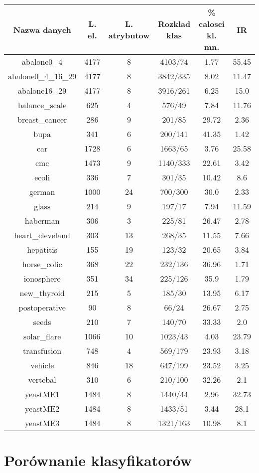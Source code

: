 \begin{tabular}{|c|c|c|c|c|c|}%
	\hline%
	Nazwa danych&L. el.&L. atrybutow&Rozklad klas&\% calosci kl. mn.&IR\\%
	\hline%
	abalone0\_4&4177&8&4103/74&1.77&55.45\\%
	\hline%
	abalone0\_4\_16\_29&4177&8&3842/335&8.02&11.47\\%
	\hline%
	abalone16\_29&4177&8&3916/261&6.25&15.0\\%
	\hline%
	balance\_scale&625&4&576/49&7.84&11.76\\%
	\hline%
	breast\_cancer&286&9&201/85&29.72&2.36\\%
	\hline%
	bupa&341&6&200/141&41.35&1.42\\%
	\hline%
	car&1728&6&1663/65&3.76&25.58\\%
	\hline%
	cmc&1473&9&1140/333&22.61&3.42\\%
	\hline%
	ecoli&336&7&301/35&10.42&8.6\\%
	\hline%
	german&1000&24&700/300&30.0&2.33\\%
	\hline%
	glass&214&9&197/17&7.94&11.59\\%
	\hline%
	haberman&306&3&225/81&26.47&2.78\\%
	\hline%
	heart\_cleveland&303&13&268/35&11.55&7.66\\%
	\hline%
	hepatitis&155&19&123/32&20.65&3.84\\%
	\hline%
	horse\_colic&368&22&232/136&36.96&1.71\\%
	\hline%
	ionosphere&351&34&225/126&35.9&1.79\\%
	\hline%
	new\_thyroid&215&5&185/30&13.95&6.17\\%
	\hline%
	postoperative&90&8&66/24&26.67&2.75\\%
	\hline%
	seeds&210&7&140/70&33.33&2.0\\%
	\hline%
	solar\_flare&1066&10&1023/43&4.03&23.79\\%
	\hline%
	transfusion&748&4&569/179&23.93&3.18\\%
	\hline%
	vehicle&846&18&647/199&23.52&3.25\\%
	\hline%
	vertebal&310&6&210/100&32.26&2.1\\%
	\hline%
	yeastME1&1484&8&1440/44&2.96&32.73\\%
	\hline%
	yeastME2&1484&8&1433/51&3.44&28.1\\%
	\hline%
	yeastME3&1484&8&1321/163&10.98&8.1\\%
	\hline%
\end{tabular}%

\section{Porównanie klasyfikatorów}


